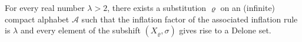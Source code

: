 \begin{thm} \label{thm:allfactors}
For every real number $\lambda>2$, there exists a substitution $\varrho$ on an (infinite) compact alphabet $\mathcal{A}$ such that the inflation factor of the associated inflation rule is $\lambda$ and every element of the subshift $(X_{\varrho},\sigma)$ gives rise to a Delone set. 
\end{thm}
